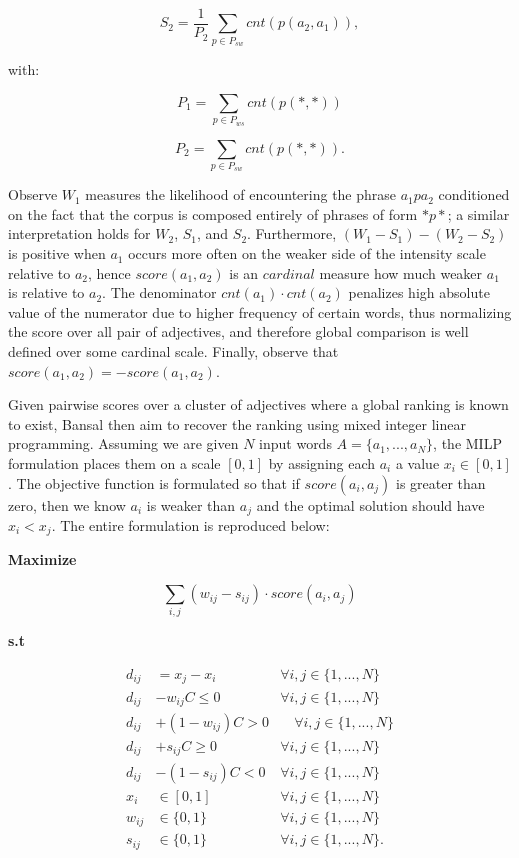 \[ S_2 = \frac{1}{P_2} \sum_{p \in P_{sw}} cnt(p(a_2, a_1)),\]

with:

\[ P_1 = \sum_{p \in P_{ws}} cnt(p(*, *))\]

\[ P_2 = \sum_{p \in P_{sw}} cnt(p(*, *)).\]


Observe $W_1$ measures the likelihood of encountering the phrase $a_1 p a_2$ conditioned on the fact that the corpus is composed 
entirely of phrases of form $* p *$; a similar interpretation holds for $W_2$, $S_1$, and $S_2$. Furthermore, $(W_1 - S_1) - (W_2 - S_2)$ is positive when $a_1$ occurs more often on the weaker side of the intensity scale relative to $a_2$, hence $score(a_1, a_2)$ is an $cardinal$ measure how much weaker $a_1$ is relative to $a_2$. The denominator $cnt(a_1) \cdot cnt(a_2)$ penalizes high absolute value of the numerator due to higher frequency of certain words, thus normalizing the score over all pair of adjectives, and therefore global comparison is well defined over some cardinal scale. Finally, observe that $score(a_1, a_2) = - score(a_1, a_2)$.

Given pairwise scores over a cluster of adjectives where a global ranking is known to exist, Bansal then aim to recover the ranking using mixed integer linear programming. Assuming we are given $N$ input words $A = \{a_1, ..., a_N\}$, the MILP formulation places them on a scale $[0,1]$ by assigning each $a_i$ a value $x_i \in [0,1]$. The objective function is formulated so that if $score(a_i, a_j)$ is greater than zero, then we know $a_i$ is weaker than $a_j$ and the optimal solution should have $x_i < x_j$. The entire formulation is reproduced below:

{\bf Maximize}

\[ \sum_{i,j} (w_{ij} - s_{ij}) \cdot score(a_i, a_j)\]

{\bf s.t}

\begin{align*}
  d_{ij} &= x_j - x_i          &\forall i,j \in \{1,...,N\}\\
  d_{ij} &- w_{ij}C \leq 0     &\forall i,j \in \{1,...,N\}\\
  d_{ij} &+ (1 - w_{ij})C > 0  &\quad \forall i,j \in \{1,...,N\}\\
  d_{ij} &+ s_{ij}C \geq 0     &\forall i,j \in \{1,...,N\}\\
  d_{ij} &- (1 - s_{ij})C < 0  &\forall i,j \in \{1,...,N\}\\
  x_i    &\in [0,1]            &\forall i,j \in \{1,...,N\}\\
  w_{ij} &\in \{0,1\}          &\forall i,j \in \{1,...,N\}\\
  s_{ij} &\in \{0,1\}          &\forall i,j \in \{1,...,N\}.
\end{align*}


